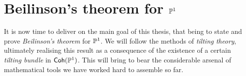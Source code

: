 \chapter{Beilinson's theorem for $\mathbb{P}^{{1}}$}
\label{chap_beilinsons_theorem}

It is now time to deliver on the main goal of this thesis, that being
to state and prove \emph{Beilinson's theorem} for $\mathbb{P}^{{1}}$.
We will follow the methods of \emph{tilting theory}, ultimately
realising this result as a consequence of the existence of a certain
\emph{tilting bundle} in $\operatorname{\mathsf{Coh}}(\mathbb{P}^{{1}})$.
This will bring to bear the considerable arsenal of mathematical
tools we have worked hard to assemble so far.



